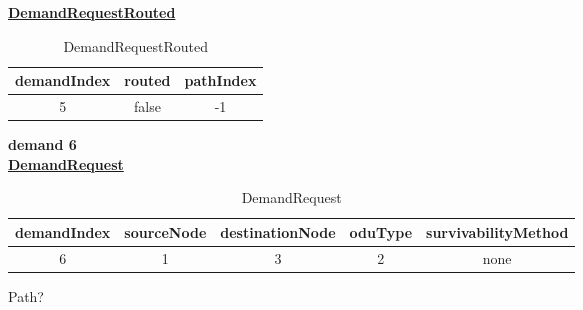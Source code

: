 \underline{\textbf{DemandRequestRouted}}

\begin{table}[H]
	\centering
	\begin{tabular}{| c | c | c |}
		\hline
		\textbf{demandIndex} & \textbf{routed}  & \textbf{pathIndex}\\ \hline
		5                    & false            & -1                 \\ \hline
	\end{tabular}
	\caption{DemandRequestRouted}
	\label{demand_request_routed}
\end{table}

\textbf{demand 6}\\

\underline{\textbf{DemandRequest}}

\begin{table}[H]
	\centering
	\begin{tabular}{| c | c | c | c | c |}
		\hline
		\textbf{demandIndex} & \textbf{sourceNode} & \textbf{destinationNode} & \textbf{oduType} & \textbf{survivabilityMethod}\\ \hline
		6                    & 1                   & 3                        & 2                & none						   \\ \hline
	\end{tabular}
	\caption{DemandRequest}
	\label{demand_request}
\end{table}

Path?\\

\begin{table}[H]
	\centering
	\caption{paths}
	\label{paths}
\end{table}

